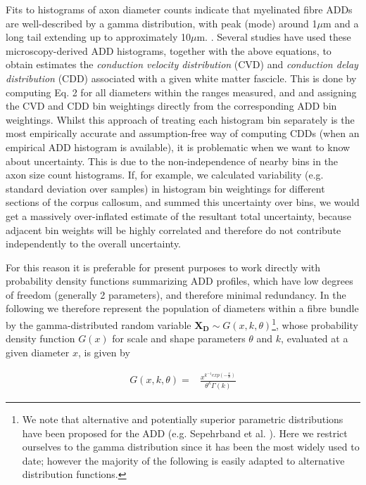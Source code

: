 Fits to histograms of axon diameter counts indicate that myelinated fibre ADDs are well-described by a gamma distribution, with peak (mode) around 1$\mu$m and a long tail extending up to approximately 10$\mu$m. . Several studies have used these microscopy-derived ADD histograms, together with the above equations, to obtain estimates the \textit{conduction velocity distribution} (CVD) and \textit{conduction delay distribution} (CDD) associated with a given white matter fascicle. This is done by computing Eq. 2 for all diameters within the ranges measured, and and assigning the CVD and CDD bin weightings directly from the corresponding ADD bin weightings. Whilst this approach of treating each histogram bin separately is the most empirically accurate and assumption-free way of computing CDDs (when an empirical ADD histogram is available), it is problematic when we want to know about uncertainty. This is due to the non-independence of nearby bins in the axon size count histograms. If, for example, we calculated variability (e.g. standard deviation over samples) in histogram bin weightings for different sections of the corpus callosum, and summed this uncertainty over bins, we would get a massively over-inflated estimate of the resultant total uncertainty, because adjacent bin weights will be highly correlated and therefore do not contribute independently to the overall uncertainty. 

For this reason it is preferable for present purposes to work directly with probability density functions summarizing ADD profiles, which have low degrees of freedom (generally 2 parameters), and therefore minimal redundancy. In the following we therefore represent the population of diameters within a fibre bundle by the gamma-distributed random variable $\mathbf{X_D} \sim G(x,k,\theta)$\footnote{We note that alternative and potentially superior parametric distributions have been proposed for the ADD (e.g. Sepehrband et al. ). Here we restrict ourselves to the gamma distribution since it has been the most widely used to date; however the majority of the following is easily adapted to alternative distribution functions. 
}, whose probability density function $G(x)$ for scale and shape parameters $\theta$ and $k$, evaluated at a given diameter $x$, is given by 


\begin{eqnarray}
G(x,k,\theta) =& \frac{\displaystyle x^{k^{-1} exp(- \frac{\displaystyle x}{ \displaystyle \theta})}}{\displaystyle \theta^{k} \Gamma(k)} 
\end{eqnarray}

